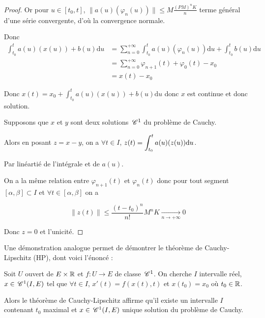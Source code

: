 \begin{proof}
    Or pour $u \in [t_0, t]$, $\| a(u)(\varphi_n(u)) \| \leqslant M \frac{(PM)^nK}{n}$ terme général d'une 
    série convergente, d'où la convergence normale. 

    Donc 
    \begin{align}
        \int_{t_0}^{t} a(u)(x(u)) + b(u) \mathrm d u & = \sum_{n = 0}^{+ \infty} \int_{t_0}^{t} a(u)(\varphi_n(u)) \mathrm d u + \int_{t_0}^{t} b(u) \mathrm d u \\
        & = \sum_{n = 0}^{+ \infty} \varphi_{n + 1}(t) + \varphi_0(t) - x_0 \\
        & = x(t) - x_0
    \end{align}

    Donc $x(t) = x_0 + \int_{t_0}^{t} a(u)(x(u)) + b(u) \mathrm d u$ donc $x$ est continue et donc 
    solution. 


    \lvspace {}

    \svspace Supposons que $x$ et $y$ sont deux solutions $\,\mathscr C^{1}$ du problème de Cauchy.

    Alors en posant $z = x - y$, on a $\forall t \in I$, $z(t) = \displaystyle \int_{t_0}^{t} a(u)(z(u)) \mathrm d u$.

    Par linéartié de l'intégrale et de $a(u)$. 

    On a la même relation entre $\varphi_{n + 1}(t)$ et $\varphi_n(t)$ donc pour tout 
    segment $[\alpha, \beta] \subset I$ et 
    $\forall t \in [\alpha, \beta]$ on a 
    
    $$\| z(t) \| \leqslant \frac{(t - t_0)^n}{n!}M^nK \xrightarrow[n \to + \infty]{} 0$$

    Donc $z = 0$ et l'unicité. 
\end{proof}

\begin{remarque}
    Une démonstration analogue permet de démontrer le théorème de Cauchy-Lipschitz (HP), dont voici l'énoncé :

    Soit $U$ ouvert de $E \times \mathbb{R}$ et $f : U \to E$ de classe $\,\mathscr C^{1}$. On cherche 
    $I$ intervalle réel, $x \in \,\mathscr C^{1} (I, E)$ tel que $\forall t \in I$, 
    $x'(t) = f(x(t), t)$ et $x(t_0) = x_0$ où $t_0 \in \mathbb{R}$. 

    Alors le théorème de Cauchy-Lipschitz affirme qu'il existe un intervalle $I$ contenant 
    $t_0$ maximal 
    et $x \in \,\mathscr C^{1} (I, E)$ unique solution du problème de Cauchy.
\end{remarque}

